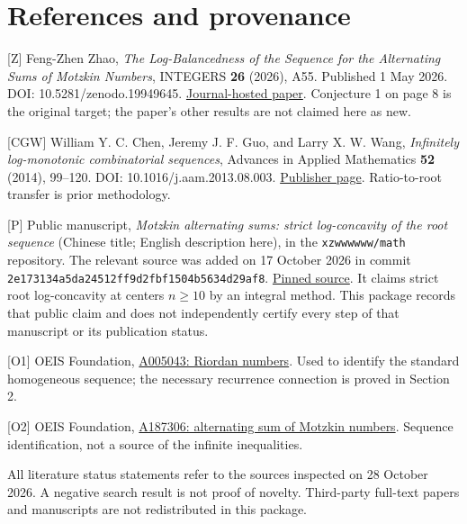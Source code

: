 \documentclass[
  11pt,
  a4paper,
]{article}
\begin{document}
\section{References and provenance}\label{references-and-provenance}

{[}Z{]} Feng-Zhen Zhao, \emph{The Log-Balancedness of the Sequence for
the Alternating Sums of Motzkin Numbers}, INTEGERS \textbf{26} (2026),
A55. Published 1 May 2026. DOI: 10.5281/zenodo.19949645.
\href{https://math.colgate.edu/~integers/aa55/aa55.pdf}{Journal-hosted
paper}. Conjecture 1 on page 8 is the original target; the paper's other
results are not claimed here as new.

{[}CGW{]} William Y. C. Chen, Jeremy J. F. Guo, and Larry X. W. Wang,
\emph{Infinitely log-monotonic combinatorial sequences}, Advances in
Applied Mathematics \textbf{52} (2014), 99--120. DOI:
10.1016/j.aam.2013.08.003.
\href{https://www.sciencedirect.com/science/article/pii/S0196885813000973}{Publisher
page}. Ratio-to-root transfer is prior methodology.

{[}P{]} Public manuscript, \emph{Motzkin alternating sums: strict
log-concavity of the root sequence} (Chinese title; English description
here), in the \texttt{xzwwwwww/math} repository. The relevant source was
added on 17 October 2026 in commit
\texttt{2e173134a5da24512ff9d2fbf1504b5634d29af8}.
\href{https://github.com/xzwwwwww/math/blob/2e173134a5da24512ff9d2fbf1504b5634d29af8/Motzkin\%E7\%8C\%9C\%E6\%83\%B3/motzkin_root_log_concavity.tex}{Pinned
source}. It claims strict root log-concavity at centers \(n\ge10\) by an
integral method. This package records that public claim and does not
independently certify every step of that manuscript or its publication
status.

{[}O1{]} OEIS Foundation, \href{https://oeis.org/A005043}{A005043:
Riordan numbers}. Used to identify the standard homogeneous sequence;
the necessary recurrence connection is proved in Section 2.

{[}O2{]} OEIS Foundation, \href{https://oeis.org/A187306}{A187306:
alternating sum of Motzkin numbers}. Sequence identification, not a
source of the infinite inequalities.

All literature status statements refer to the sources inspected on 28
October 2026. A negative search result is not proof of novelty.
Third-party full-text papers and manuscripts are not redistributed in
this package.
\end{document}
